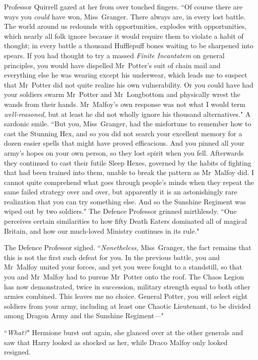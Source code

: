 Professor Quirrell gazed at her from over touched fingers. ``Of course there are ways you \emph{could} have won, Miss~Granger. There always are, in every lost battle. The world around us redounds with opportunities, explodes with opportunities, which nearly all folk ignore because it would require them to violate a habit of thought; in every battle a thousand Hufflepuff bones waiting to be sharpened into spears. If you had thought to try a massed \emph{Finite Incantatem} on general principles, you would have dispelled Mr~Potter's suit of chain mail and everything else he was wearing except his underwear, which leads me to suspect that Mr~Potter did not quite realize his own vulnerability. Or you could have had your soldiers swarm Mr~Potter and Mr~Longbottom and physically wrest the wands from their hands. Mr~Malfoy's own response was not what I would term \emph{well-reasoned}, but at least he did not wholly ignore his thousand alternatives." A sardonic smile. ``But you, Miss~Granger, had the misfortune to remember how to cast the Stunning Hex, and so you did not search your excellent memory for a dozen easier spells that might have proved efficacious. And you pinned all your army's hopes on your own person, so they lost spirit when you fell. Afterwards they continued to cast their futile Sleep Hexes, governed by the habits of fighting that had been trained into them, unable to break the pattern as Mr~Malfoy did. I cannot quite comprehend what goes through people's minds when they repeat the same failed strategy over and over, but apparently it is an astonishingly rare realization that you can try something else. And so the Sunshine Regiment was wiped out by two soldiers." The Defence Professor grinned mirthlessly. ``One perceives certain similarities to how fifty Death Eaters dominated all of magical Britain, and how our much-loved Ministry continues in its rule."

The Defence Professor sighed. ``\emph{Nonetheless,} Miss~Granger, the fact remains that this is not the first such defeat for you. In the previous battle, you and Mr~Malfoy united your forces, and yet you were fought to a standstill, so that you and Mr~Malfoy had to pursue Mr~Potter onto the roof. The Chaos Legion has now demonstrated, twice in succession, military strength equal to both other armies combined. This leaves me no choice. General Potter, you will select eight soldiers from your army, including at least one Chaotic Lieutenant, to be divided among Dragon Army and the Sunshine Regiment—"

``\emph{What?}" Hermione burst out again, she glanced over at the other generals and saw that Harry looked as shocked as her, while Draco Malfoy only looked resigned.

